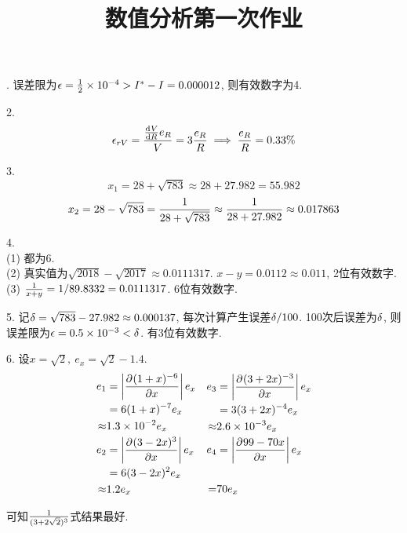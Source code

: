 \documentclass[UTF8,9pt]{ctexart}
\title{数值分析第一次作业}
\begin{document}
 
. 误差限为$\epsilon = \frac{1}{2}\times 10^{-4}>I^*-I=0.000012$, 则有效数字为4.

2. 
$$\epsilon_{rV}=\frac{\frac{\mathrm{d}^{} V}{\mathrm{d} {R}^{}}e_R}{V}=3\frac{e_R}{R} \implies \frac{e_R}{R}=0.33\%$$

3.
$$x_1=28+\sqrt{783}\approx 28+27.982 = 55.982$$
$$x_2=28-\sqrt{783}=\frac{1}{28+\sqrt{783}}\approx \frac{1}{28+27.982}\approx 0.017863$$

4. \\
(1) 都为6.\\
(2) 真实值为$\sqrt{2018}-\sqrt{2017}\approx0.0111317$. $x-y=0.0112\approx0.011$, 2位有效数字.\\
(3) $\frac{1}{x+y}=1/89.8332=0.0111317$. 6位有效数字.

 5. 记$\delta=\sqrt{783}-27.982\approx0.000137$, 每次计算产生误差$\delta/100$. 100次后误差为$\delta$, 则误差限为$\epsilon=0.5\times 10^{-3}<\delta$. 有3位有效数字.

6. 设$x=\sqrt{2},\ e_x=\sqrt{2}-1.4$. 
$$\begin{array}{cc}
    \begin{aligned} 
        e_1&=\left|\frac{\partial^{} (1+x)^{-6}}{\partial {x}^{}}\right|e_x\\
        &=6(1+x)^{-7}e_x\\
        \approx& 1.3\times 10^{-2}e_x\\
        e_2&=\left|\frac{\partial^{} (3-2x)^3}{\partial {x}^{}}\right|e_x\\
        &=6(3-2x)^{2}e_x\\
        \approx& 1.2e_x
     \end{aligned}
    &
    \begin{aligned} 
        e_3&=\left|\frac{\partial^{} (3+2x)^{-3}}{\partial {x}^{}}\right|e_x\\
        &=3(3+2x)^{-4}e_x\\
        \approx& 2.6\times 10^{-3}e_x\\
        e_4&=\left|\frac{\partial^{} 99-70x}{\partial {x}^{}}\right|e_x\\
        &\\
        =&70e_x
     \end{aligned}
\end{array}$$

可知$\frac{1}{(3+2\sqrt{2})^3}$式结果最好.
\end{document}

